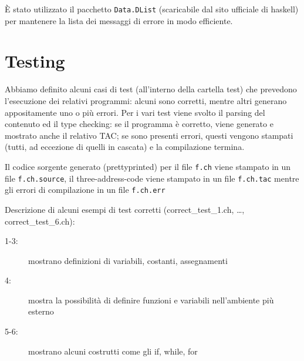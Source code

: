\documentclass{report}
\newcommand{\term}[1]{\texttt{#1}}
\begin{document}
È stato utilizzato il pacchetto \term{Data.DList} (scaricabile dal sito ufficiale di haskell) per mantenere
la lista dei messaggi di errore in modo efficiente.

\section{Testing}

Abbiamo definito alcuni casi di test (all'interno della cartella test) che prevedono l'esecuzione dei
relativi programmi: alcuni sono corretti, mentre altri generano appositamente uno o più errori. Per i vari 
test viene svolto il parsing del contenuto ed il type checking: se il programma è corretto, viene generato 
e mostrato anche il relativo TAC; se sono presenti errori, questi vengono stampati (tutti, ad eccezione
di quelli in cascata) e la compilazione termina.

Il codice sorgente generato (prettyprinted) per il file \term{f.ch} viene stampato in un file \term{f.ch.source},
il three-address-code viene stampato in un file \term{f.ch.tac} mentre gli errori di compilazione in un file
\term{f.ch.err}

Descrizione di alcuni esempi di test corretti (correct\_test\_1.ch, …, correct\_test\_6.ch):
\begin{description}
    \item[1-3:] mostrano definizioni di variabili, costanti, assegnamenti
    \item[4:] mostra la possibilità di definire funzioni e variabili nell'ambiente più esterno
    \item[5-6:] mostrano alcuni costrutti come gli if, while, for

\end{description}
\end{document}

